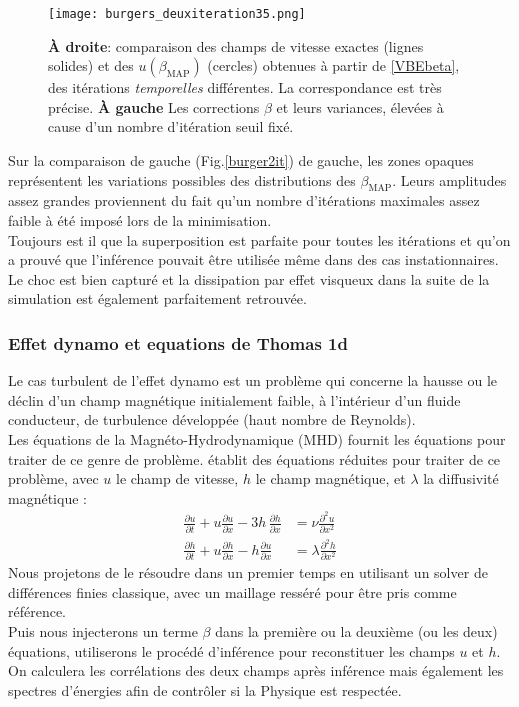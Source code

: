 \documentclass[a4paper,12pt]{article}
\newcommand{\bepar}[1]{
	\left( #1 \right)  
}
\newcommand{\bmap}{\beta_{\text{MAP}}}
\newcommand\bk{\color{black}}
\newcommand\dsb{\color{dsb}}
\numberwithin{equation}{section} %
\begin{document}
\begin{figure}[!ht]
\vspace{-5mm}
\centering
\texttt{[image: burgers\_deuxiteration35.png]}
\caption{\small{\textbf{À droite}: comparaison des champs de vitesse exactes (lignes solides) et des $u\bepar{\bmap}$ (cercles) obtenues à partir de \eqref{VBEbeta}, des itérations \textit{temporelles} différentes. La correspondance est très précise. \textbf{À gauche} Les corrections $\beta$ et leurs variances, élevées à cause d'un nombre d'itération seuil fixé.}}
\label{burger2it}
\end{figure}
\noindent Sur la comparaison de gauche (Fig.\eqref{burger2it}) de gauche, les zones opaques représentent les variations possibles des distributions des $\bmap$. Leurs amplitudes assez grandes proviennent du fait qu'un nombre d'itérations maximales assez faible à été imposé lors de la minimisation.\\ 
Toujours est il que la superposition est parfaite pour toutes les itérations et qu'on a prouvé que l'inférence pouvait être utilisée même dans des cas instationnaires.\\
Le choc est bien capturé et la dissipation par effet visqueux dans la suite de la simulation est également parfaitement retrouvée.

\dsb \subsubsection{Effet dynamo et equations de Thomas 1d} \bk
\noindent Le cas turbulent de l'effet dynamo est un problème qui concerne la hausse ou le déclin d'un champ magnétique initialement faible, à l'intérieur d'un fluide conducteur, de turbulence développée (haut nombre de Reynolds).\\
Les équations de la Magnéto-Hydrodynamique (MHD) fournit les équations pour traiter de ce genre de problème. \cite{thomas1968numerical} établit des équations réduites pour traiter de ce problème, avec $u$ le champ de vitesse, $h$ le champ magnétique, et $\lambda$ la diffusivité magnétique : 
\begin{align}
\frac{\partial u}{\partial t} + u \frac{\partial u}{\partial x} -3h\, \frac{\partial h}{\partial x} &= \nu \frac{\partial^2 u}{\partial x^2} \label{uthomas} \\[3mm]
\frac{\partial h}{\partial t} + u \frac{\partial h}{\partial x} - h \frac{\partial u}{\partial x} &= \lambda \frac{\partial^2 h}{\partial x^2} 
\end{align}
Nous projetons de le résoudre dans un premier temps en utilisant un solver de différences finies classique, avec un maillage resséré pour être pris comme référence.\\
Puis nous injecterons un terme $\beta$ dans la première ou la deuxième (ou les deux) équations, utiliserons le procédé d'inférence pour reconstituer les champs $u$ et $h$.\\ On calculera les corrélations des deux champs après inférence mais également les spectres d'énergies afin de contrôler si la Physique est respectée.\\
\end{document}

